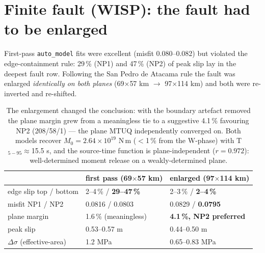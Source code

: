 \documentclass[11pt]{article}
\begin{document}
\section{Finite fault (WISP): the fault had to be enlarged}
First-pass \texttt{auto\_model} fits were excellent (misfit 0.080--0.082) but violated the
edge-containment rule: 29\,\% (NP1) and 47\,\% (NP2) of peak slip lay in the deepest fault row.
Following the San Pedro de Atacama rule the fault was enlarged \emph{identically on both
planes} (69$\times$57 km $\to$ 97$\times$114 km) and both were re-inverted and re-shifted.

\begin{table}[H]\centering\small
\begin{tabular}{lll}
\toprule
 & first pass (69$\times$57 km) & enlarged (97$\times$114 km) \\
\midrule
edge slip top / bottom & 2--4\,\% / \textbf{29--47\,\%} & 2--3\,\% / \textbf{2--4\,\%} \\
misfit NP1 / NP2 & 0.0816 / 0.0803 & 0.0829 / \textbf{0.0795} \\
plane margin & 1.6\,\% (meaningless) & \textbf{4.1\,\%, NP2 preferred} \\
peak slip & 0.53--0.57 m & 0.44--0.50 m \\
$\Delta\sigma$ (effective-area) & 1.2 MPa & 0.65--0.83 MPa \\
\bottomrule
\end{tabular}
\caption{The enlargement changed the conclusion: with the boundary artefact removed the plane
margin grew from a meaningless tie to a suggestive 4.1\,\% favouring NP2 (208/58/1) --- the
plane MTUQ independently converged on. Both models recover $M_0=2.64\times10^{19}$ N\,m
($<$1\,\% from the W-phase) with T$_{5-95}\approx$15.5 s, and the source-time function is
plane-independent ($r=0.972$): well-determined moment release on a weakly-determined plane.}
\end{table}
\end{document}
